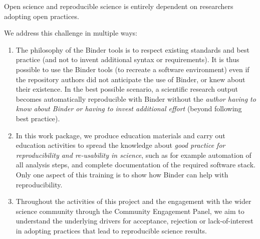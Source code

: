 \begin{workpackage}

\begin{wpdescription}

  Open science and reproducible science is entirely dependent on researchers
  adopting open practices. 

  We address this challenge in multiple ways:
  \begin{enumerate}
  \item The philosophy of the Binder tools is to respect existing standards and
    best practice (and not to invent additional syntax or requirements). It is
    thus possible to use the Binder tools (to recreate a software environment)
    even if the repository authors did not anticipate the use of Binder, or knew
    about their existence. In the best possible scenario, a scientific research
    output becomes automatically reproducible with Binder without the
    \emph{author having to know about Binder or having to invest additional
      effort} (beyond following best practice).

    \item In this work package, we produce education materials and carry out
      education activities to spread the knowledge about \emph{good practice for
        reproducibility and re-usability in science}, such as for example
      automation of all analysis steps, and complete documentation of the
      required software stack. Only one aspect of this training is to show how
      Binder can help with reproducibility.

    \item Throughout the activities of this project and the engagement with the
      wider science community through the Community Engagement Panel, we aim to understand 
      the underlying drivers for
      acceptance, rejection or lack-of-interest in adopting practices that lead
      to reproducible science results.
  \end{enumerate}

  

\end{wpdescription}
\end{workpackage}
